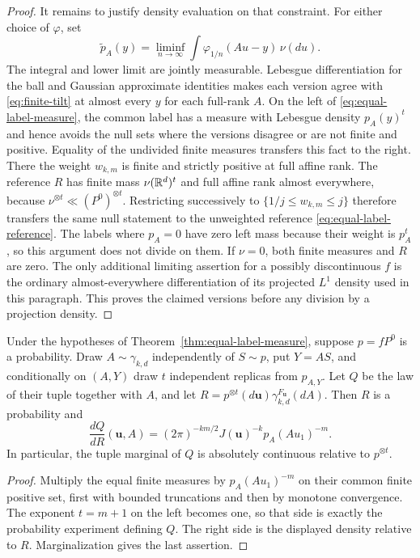 \begin{proof}
It remains to justify density evaluation on that constraint. For either
choice of $\varphi$, set
\[
 \widetilde p_A(y)=\liminf_{n\to\infty}
        \int\varphi_{1/n}(Au-y)\,\nu(du).
\]
The integral and lower limit are jointly measurable. Lebesgue
differentiation for the ball and Gaussian approximate identities makes each
version agree with \eqref{eq:finite-tilt} at almost every $y$ for each
full-rank $A$. On the left of \eqref{eq:equal-label-measure}, the common label
has a measure with Lebesgue density $p_A(y)^t$ and hence avoids the null sets
where the versions disagree or are not finite and positive. Equality of the
undivided finite measures transfers this fact to the right. There the weight
$w_{k,m}$ is finite and strictly positive at full affine rank. The reference
$R$ has finite mass $\nu(\mathbb R^d)^t$ and full affine rank almost everywhere,
because $\nu^{\otimes t}\ll(P^0)^{\otimes t}$. Restricting successively to
$\{1/j\le w_{k,m}\le j\}$ therefore transfers the same null statement to
the unweighted reference \eqref{eq:equal-label-reference}. The labels where
$p_A=0$ have zero left mass because their weight is $p_A^t$, so this
argument does not divide on them. If $\nu=0$, both finite measures and $R$
are zero. The only additional limiting assertion for a possibly
discontinuous $f$ is the ordinary almost-everywhere differentiation of its
projected $L^1$ density used in this paragraph. This proves the claimed
versions before any division by a projection density.
\end{proof}

\begin{corollary}\label{cor:replica-likelihood}
Under the hypotheses of Theorem~\ref{thm:equal-label-measure}, suppose
$p=fP^0$ is a probability. Draw $A\sim\gamma_{k,d}$ independently of
$S\sim p$, put $Y=AS$, and conditionally on $(A,Y)$ draw $t$ independent
replicas from $p_{A,Y}$. Let $Q$ be the law of their tuple together with
$A$, and let $R=p^{\otimes t}(d\mathbf u)\gamma_{k,d}^{F_{\mathbf u}}(dA)$.
Then $R$ is a probability and
\begin{equation}\label{eq:replica-likelihood}
 \frac{dQ}{dR}(\mathbf u,A)
 =(2\pi)^{-km/2}J(\mathbf u)^{-k}p_A(Au_1)^{-m}.
\end{equation}
In particular, the tuple marginal of $Q$ is absolutely continuous relative
to $p^{\otimes t}$.
\end{corollary}

\begin{proof}
Multiply the equal finite measures by $p_A(Au_1)^{-m}$ on their common
finite positive set, first with bounded truncations and then by monotone
convergence. The exponent $t=m+1$ on the left becomes one, so that side is
exactly the probability experiment defining $Q$. The right side is the
displayed density relative to $R$. Marginalization gives the last assertion.
\end{proof}


